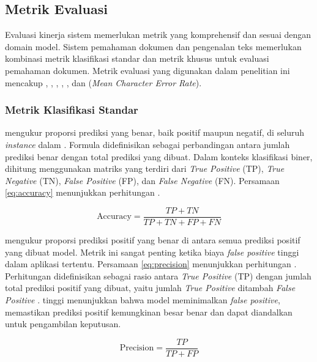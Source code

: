 \subsection{Metrik Evaluasi}
\label{subsec:metrik-evaluasi}

Evaluasi kinerja sistem \ml{} memerlukan metrik yang komprehensif dan sesuai dengan domain model. Sistem pemahaman dokumen dan pengenalan teks memerlukan kombinasi metrik klasifikasi standar dan metrik khusus untuk evaluasi pemahaman dokumen. Metrik evaluasi yang digunakan dalam penelitian ini mencakup \accuracy, \precision, \recall, \fscore, \coverage, dan \mcer{} (\emph{Mean Character Error Rate}).

\subsubsection{Metrik Klasifikasi Standar}

\accuracyfl{} mengukur proporsi prediksi yang benar, baik positif maupun negatif, di seluruh \emph{instance} dalam \dataset. Formula \accuracy{} didefinisikan sebagai perbandingan antara jumlah prediksi benar dengan total prediksi yang dibuat. Dalam konteks klasifikasi biner, \accuracy{} dihitung menggunakan matriks yang terdiri dari \emph{True Positive} (TP), \emph{True Negative} (TN), \emph{False Positive} (FP), dan \emph{False Negative} (FN). Persamaan \eqref{eq:accuracy} menunjukkan perhitungan \accuracy{} \parencite{jayaswal2020evalmetrics}. 

\begin{equation}
    \label{eq:accuracy}
\text{Accuracy} = \frac{TP + TN}{TP + TN + FP + FN}
\end{equation}

\precisionfl{} mengukur proporsi prediksi positif yang benar di antara semua prediksi positif yang dibuat model. Metrik ini sangat penting ketika biaya \emph{false positive} tinggi dalam aplikasi tertentu. Persamaan \eqref{eq:precision} menunjukkan perhitungan \precision. Perhitungan \precision{} didefinisikan sebagai rasio antara \emph{True Positive} (TP) dengan jumlah total prediksi positif yang dibuat, yaitu jumlah \emph{True Positive} ditambah \emph{False Positive} \parencite{jayaswal2020evalmetrics}. \precisionfl{} tinggi menunjukkan bahwa model meminimalkan \emph{false positive}, memastikan prediksi positif kemungkinan besar benar dan dapat diandalkan untuk pengambilan keputusan.

\begin{equation}
    \label{eq:precision}
\text{Precision} = \frac{TP}{TP + FP}
\end{equation}

